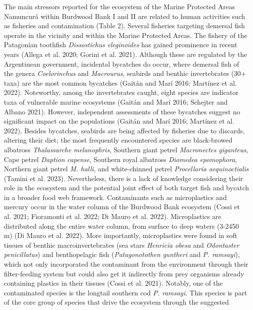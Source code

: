 \documentclass[
]{article}
\begin{document}
The main stressors reported for the ecosystem of the Marine Protected
Areas Namuncurá within Burdwood Bank I and II are related to human
activities such as fisheries and contamination (Table 2). Several
fisheries targeting demersal fish operate in the vicinity and within the
Marine Protected Areas. The fishery of the Patagonian toothfish
\emph{Dissostichus eleginoides} has gained prominence in recent years
(Allega et al. 2020; Gorini et al. 2021). Although these are regulated
by the Argentinean government, incidental bycatches do occur, where
demersal fish of the genera \emph{Coelorinchus} and \emph{Macrourus},
seabirds and benthic invertebrates (30+ taxa) are the most common
bycatches (Gaitán and Marí 2016; Martínez et al. 2022). Noteworthy,
among the invertebrates caught, eight species are indicator taxa of
vulnerable marine ecosystems (Gaitán and Marí 2016; Schejter and Albano
2021). However, independent assessments of these bycatches suggest no
significant impact on the populations (Gaitán and Marí 2016; Martínez et
al. 2022). Besides bycatches, seabirds are being affected by fisheries
due to discards, altering their diet; the most frequently encountered
species are black-browed albatross \emph{Thalassarche melanophris},
Southern giant petrel \emph{Macronectes giganteus}, Cape petrel
\emph{Daption capense}, Southern royal albatross \emph{Diomedea
epomophora}, Northern giant petrel \emph{M. halli}, and white-chinned
petrel \emph{Procellaria aequinoctialis} (Tamini et al. 2023).
Nevertheless, there is a lack of knowledge considering their role in the
ecosystem and the potential joint effect of both target fish and bycatch
in a broader food web framework. Contaminants such as microplastics and
mercury occur in the water column of the Burdwood Bank ecosystem (Cossi
et al. 2021; Fioramonti et al. 2022; Di Mauro et al. 2022).
Microplastics are distributed along the entire water column, from
surface to deep waters (3-2450 m) (Di Mauro et al. 2022). More
importantly, microplastics were found in soft tissues of benthic
macroinvertebrates (sea stars \emph{Henricia obesa} and \emph{Odontaster
penicillatus}) and benthopelagic fish (\emph{Patagonotothen guntheri}
and \emph{P. ramsayi}), which not only incorporated the contaminant from
the environment through their filter-feeding system but could also get
it indirectly from prey organisms already containing plastics in their
tissues (Cossi et al. 2021). Notably, one of the contaminated species is
the longtail southern cod \emph{P. ramsayi}. This species is part of the
core group of species that drive the ecosystem through the suggested
\end{document}

